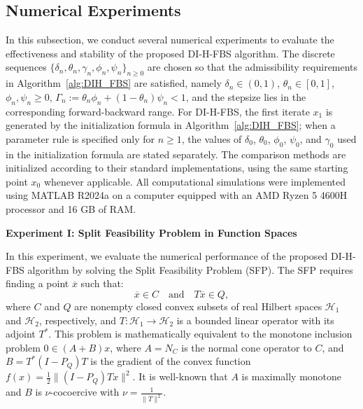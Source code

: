 \documentclass{article}
\theoremstyle{definition}
\theoremstyle{definition}
\theoremstyle{definition}
\begin{document}
\subsection{Numerical Experiments}\label{sec:Numerical experiments and discrete algorithm}

In this subsection, we conduct several numerical experiments to evaluate the effectiveness and stability of the proposed DI-H-FBS algorithm. The discrete sequences $\{ \delta_n, \theta_n, \gamma_n, \phi_n, \psi_n \}_{n \ge 0}$ are chosen so that the admissibility requirements in Algorithm~\ref{alg:DIH_FBS} are satisfied, namely $\delta_n\in(0,1)$, $\theta_n\in[0,1]$, $\phi_n,\psi_n\ge0$, $\Gamma_n:=\theta_n\phi_n+(1-\theta_n)\psi_n<1$, and the stepsize lies in the corresponding forward-backward range. For DI-H-FBS, the first iterate $x_1$ is generated by the initialization formula in Algorithm~\ref{alg:DIH_FBS}; when a parameter rule is specified only for $n\ge1$, the values of $\delta_0$, $\theta_0$, $\phi_0$, $\psi_0$, and $\gamma_0$ used in the initialization formula are stated separately. The comparison methods are initialized according to their standard implementations, using the same starting point $x_0$ whenever applicable. All computational simulations were implemented using MATLAB R2024a on a computer equipped with an AMD Ryzen 5 4600H processor and 16 GB of RAM. 

\noindent \textbf{Experiment I: Split Feasibility Problem in Function Spaces}

In this experiment, we evaluate the numerical performance of the proposed DI-H-FBS algorithm by solving the Split Feasibility Problem (SFP). The SFP requires finding a point $\overline{x}$ such that:
\begin{equation*}
\overline{x} \in C \quad \text{and} \quad T \overline{x} \in Q,
\end{equation*}
where $C$ and $Q$ are nonempty closed convex subsets of real Hilbert spaces $\mathcal{H}_1$ and $\mathcal{H}_2$, respectively, and $T: \mathcal{H}_1 \to \mathcal{H}_2$ is a bounded linear operator with its adjoint $T^{*}$. This problem is mathematically equivalent to the monotone inclusion problem $0 \in (A+B)x$, where $A = N_C$ is the normal cone operator to $C$, and $B = T^*(I - P_Q)T$ is the gradient of the convex function $f(x) = \frac{1}{2}\|(I - P_Q)Tx\|^2$. It is well-known that $A$ is maximally monotone and $B$ is $\nu$-cocoercive with $\nu = \frac{1}{\|T\|^2}$.
\end{document}
